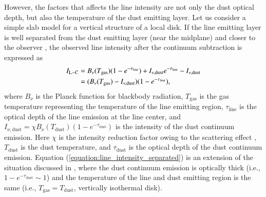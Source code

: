 \documentclass[linenumbers, twocolumn, twocolappendix, astrosymb, times]{aastex631}
\begin{document}
However, the factors that affects the line intensity are not only the dust optical depth, but also the temperature of the dust emitting layer. Let us consider a simple slab model for a vertical structure of a local disk. If the line emitting layer is well separated from the dust emitting layer (near the midplane) and closer to the observer \citep[see e.g.,][]{Bosman2021}, the observed line intensity after the continuum subtraction is expressed as 
\begin{align}\label{equation:line_intensity_separated}
    I_\mathrm{L-C} &= B_\nu(T_\mathrm{gas})(1 - e^{-\tau_\mathrm{line}}) + I_{\nu, \mathrm{dust}}e^{-\tau_\mathrm{line}} - I_{\nu, \mathrm{dust}} \notag \\
    &= (B_\nu(T_\mathrm{gas}) - I_{\nu, \mathrm{dust}})(1 - e^{-\tau_\mathrm{line}}),
\end{align}
where $B_\nu$ is the Planck function for blackbody radiation, $T_\mathrm{gas}$ is the gas temperature representing the temperature of the line emitting region, $\tau_\mathrm{line}$ is the optical depth of the line emission at the line center, and $I_{\nu, \mathrm{dust}} = \chi B_\nu(T_\mathrm{dust})(1 - e^{-\tau_\mathrm{dust}})$ is the intensity of the dust continuum emission. Here $\chi$ is the intensity reduction factor owing to the scattering effect \citep[e.g.,][]{Bosman2021}, $T_\mathrm{dust}$ is the dust temperature, and $\tau_\mathrm{dust}$ is the optical depth of the dust continuum emission. Equation (\ref{equation:line_intensity_separated}) is an extension of the situation discussed in \citet{Bosman2021}, where the dust continuum emission is optically thick (i.e., $1 - e^{-\tau_\mathrm{dust}} \sim 1$) and the temperature of the line and dust emitting region is the same (i.e., $T_\mathrm{gas} = T_\mathrm{dust}$, vertically isothermal disk).
\end{document}
